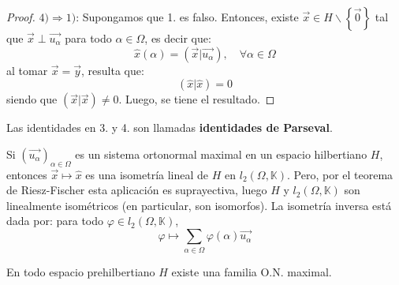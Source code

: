 \documentclass[12pt]{report}
\theoremstyle{largebreak}
\newcommand\pint[2]{\ensuremath{\left(#1\big| #2\right)}}
\begin{document}
\begin{proof}
        $4)\Rightarrow 1)$: Supongamos que 1. es falso. Entonces, existe $\vec{x}\in H\backslash\left\{\vec{0} \right\}$ tal que $\vec{x}\perp\vec{u_\alpha}$ para todo $\alpha\in\Omega$, es decir que:
        \begin{equation*}
            \hat{x}(\alpha)=\pint{\vec{x}}{\vec{u_\alpha}},\quad\forall\alpha\in\Omega
        \end{equation*}
        al tomar $\vec{x}=\vec{y}$, resulta que:
        \begin{equation*}
            \pint{\hat{x}}{\hat{x}}=0
        \end{equation*}
        siendo que $\pint{\vec{x}}{\vec{x}}\neq0$. Luego, se tiene el resultado.
    \end{proof}

    \begin{obs}
        Las identidades en 3. y 4. son llamadas \textbf{identidades de Parseval}.
    \end{obs}

    \begin{obs}
        Si $\left(\vec{u_\alpha} \right)_{\alpha\in\Omega}$ es un sistema ortonormal maximal en un espacio hilbertiano $H$, entonces $\vec{x}\mapsto\hat{x}$ es una isometría lineal de $H$ en $l_2(\Omega,\mathbb{K})$. Pero, por el teorema de Riesz-Fischer esta aplicación es suprayectiva, luego $H$ y $l_2(\Omega,\mathbb{K})$ son linealmente isométricos (en particular, son isomorfos). La isometría inversa está dada por: para todo $\varphi\in l_2(\Omega,\mathbb{K})$,
        \begin{equation*}
            \varphi\mapsto\sum_{\alpha\in\Omega}\varphi(\alpha)\vec{u_\alpha}
        \end{equation*}
    \end{obs}

    \begin{theor}
        En todo espacio prehilbertiano $H$ existe una familia O.N. maximal.
    \end{theor}
\end{document}
